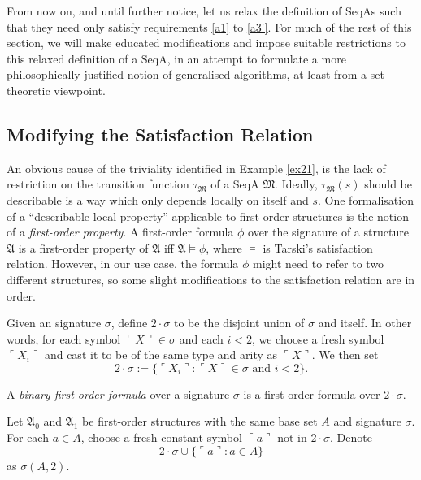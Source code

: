 \documentclass[12pt]{article}
\numberwithin{equation}{section}
\begin{document}
From now on, and until further notice, let us relax the definition of SeqAs such that they need only satisfy requirements \ref{a1} to \ref{a3'}. For much of the rest of this section, we will make educated modifications and impose suitable restrictions to this relaxed definition of a SeqA, in an attempt to formulate a more philosophically justified notion of generalised algorithms, at least from a set-theoretic viewpoint.

\subsection{Modifying the Satisfaction Relation}

An obvious cause of the triviality identified in Example \ref{ex21}, is the lack of restriction on the transition function $\tau_{\mathfrak{M}}$ of a SeqA $\mathfrak{M}$. Ideally, $\tau_{\mathfrak{M}}(s)$ should be describable is a way which only depends locally on itself and $s$. One formalisation of a ``describable local property'' applicable to first-order structures is the notion of a \emph{first-order property}. A first-order formula $\phi$ over the signature of a structure $\mathfrak{A}$ is a first-order property of $\mathfrak{A}$ iff $\mathfrak{A} \models \phi$, where $\models$ is Tarski's satisfaction relation. However, in our use case, the formula $\phi$ might need to refer to two different structures, so some slight modifications to the satisfaction relation are in order.

\begin{defi}
Given an signature $\sigma$, define $2 \cdot \sigma$ to be the disjoint union of $\sigma$ and itself. In other words, for each symbol $\ulcorner X \urcorner \in \sigma$ and each $i < 2$, we choose a fresh symbol $\ulcorner X_{i} \urcorner$ and cast it to be of the same type and arity as $\ulcorner X \urcorner$. We then set
\begin{equation*}
    2 \cdot \sigma := \{\ulcorner X_{i} \urcorner : \ulcorner X \urcorner \in \sigma \text{ and } i < 2\} \text{.}
\end{equation*}
\end{defi}

\begin{defi}
A \emph{binary first-order formula} over a signature $\sigma$ is a first-order formula over $2 \cdot \sigma$.
\end{defi}

\begin{defi}
Let $\mathfrak{A}_0$ and $\mathfrak{A}_1$ be first-order structures with the same base set $A$ and signature $\sigma$. For each $a \in A$, choose a fresh constant symbol $\ulcorner a \urcorner$ not in $2 \cdot \sigma$. Denote
\begin{equation*}
    2 \cdot \sigma \cup \{\ulcorner a \urcorner : a \in A\}
\end{equation*}
as $\sigma(A, 2)$.
\end{defi}
\end{document}
